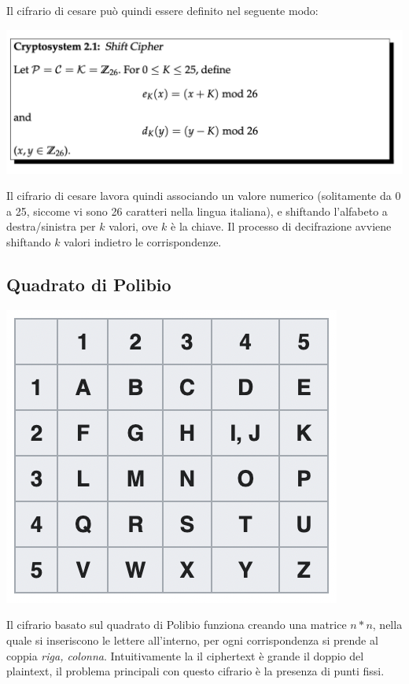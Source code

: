 \documentclass[11pt, oneside]{article}   	%
\begin{document}
Il cifrario di cesare può quindi essere definito nel seguente modo:
\begin{center}
\includegraphics[scale=0.6]{cesare}
\end{center}
Il cifrario di cesare lavora quindi associando un valore numerico (solitamente da 0 a 25, siccome vi sono 26 caratteri nella lingua italiana), e shiftando l'alfabeto a destra/sinistra per $k$ valori, ove $k$ è la chiave. Il processo di decifrazione avviene shiftando $k$ valori indietro le corrispondenze.

\subsection*{Quadrato di Polibio}
\begin{center}
\includegraphics[scale=0.6]{polibio}
\end{center}
Il cifrario basato sul quadrato di Polibio funziona creando una matrice $n * n$, nella quale si inseriscono le lettere all'interno, per ogni corrispondenza si prende al coppia \emph{riga, colonna}.
Intuitivamente la il ciphertext è grande il doppio del plaintext, il problema principali con questo cifrario è la presenza di punti fissi.
\end{document}
